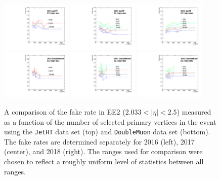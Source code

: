 \begin{figure}[!htbp]
\caption{A comparison of the fake rate in EE2 ($2.033 \mathopen< \lvert \eta \rvert \mathclose< 2.5$) measured as a function of the number of selected primary vertices in the event using the \texttt{JetHT} data set (top) and \texttt{DoubleMuon} data set (bottom). The fake rates are determined separately for 2016 (left), 2017 (center), and 2018 (right). The ranges used for comparison were chosen to reflect a roughly uniform level of statistics between all ranges.}
\centering
\includegraphics[width=0.3\textwidth]{fig/compare_pv_EE2_2016_jetht.pdf}
\includegraphics[width=0.3\textwidth]{fig/compare_pv_EE2_2017_jetht.pdf}
\includegraphics[width=0.3\textwidth]{fig/compare_pv_EE2_2018_jetht.pdf}
\includegraphics[width=0.3\textwidth]{fig/compare_pv_EE2_2016_doublemuon.pdf}
\includegraphics[width=0.3\textwidth]{fig/compare_pv_EE2_2017_doublemuon.pdf}
\includegraphics[width=0.3\textwidth]{fig/compare_pv_EE2_2018_doublemuon.pdf}
\label{fig:frpileup_EE2}
\end{figure}

